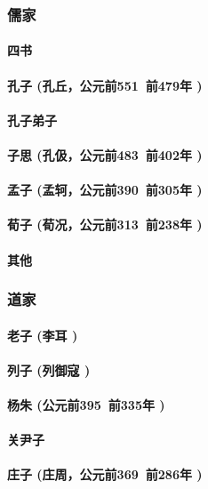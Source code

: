 \documentclass[UTF8]{../RepresentationUniverse}
\begin{document}
    \subsubsection{儒家}
        \paragraph{四书}
        \paragraph{孔子 (孔丘，公元前551~前479年 )}
        \paragraph{孔子弟子}
        \paragraph{子思 (孔伋，公元前483~前402年 )}
        \paragraph{孟子 (孟轲，公元前390~前305年 )}
        \paragraph{荀子 (荀况，公元前313~前238年 )}
        \paragraph{其他}

    \subsubsection{道家}
        \paragraph{老子 (李耳 )}
        \paragraph{列子 (列御寇 )}
        \paragraph{杨朱 (公元前395~前335年 )}
        \paragraph{关尹子}
        \paragraph{庄子 (庄周，公元前369~前286年 )}
\end{document}

